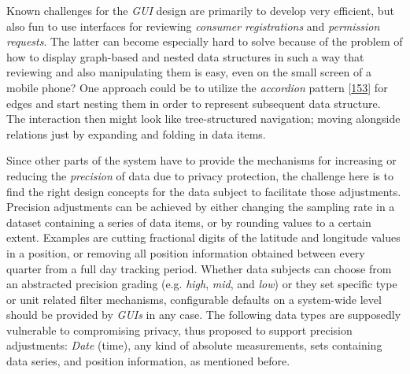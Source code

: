 \documentclass[12pt,english,a4paper,titlepage,cleardoublepage=empty,dottedtoc]{report}
\begin{document}
Known challenges for the \emph{GUI} design are primarily to develop very
efficient, but also fun to use interfaces for reviewing \emph{consumer
registrations} and \emph{permission requests}. The latter can become
especially hard to solve because of the problem of how to display
graph-based and nested data structures in such a way that reviewing and
also manipulating them is easy, even on the small screen of a mobile
phone? One approach could be to utilize the \emph{accordion} pattern
{[}\protect\hyperlink{ref-web_2016_wikipedia_accordion-gui}{153}{]} for
edges and start nesting them in order to represent subsequent data
structure. The interaction then might look like tree-structured
navigation; moving alongside relations just by expanding and folding in
data items.

Since other parts of the system have to provide the mechanisms for
increasing or reducing the \emph{precision} of data due to privacy
protection, the challenge here is to find the right design concepts for
the data subject to facilitate those adjustments. Precision adjustments
can be achieved by either changing the sampling rate in a dataset
containing a series of data items, or by rounding values to a certain
extent. Examples are cutting fractional digits of the latitude and
longitude values in a position, or removing all position information
obtained between every quarter from a full day tracking period. Whether
data subjects can choose from an abstracted precision grading (e.g.
\emph{high}, \emph{mid}, and \emph{low}) or they set specific type or
unit related filter mechanisms, configurable defaults on a system-wide
level should be provided by \emph{GUIs} in any case. The following data
types are supposedly vulnerable to compromising privacy, thus proposed
to support precision adjustments: \emph{Date} (time), any kind of
absolute measurements, sets containing data series, and position
information, as mentioned before.
\end{document}
